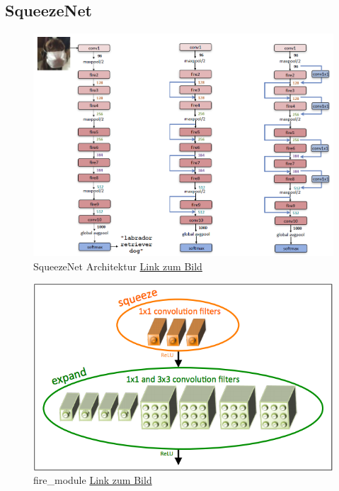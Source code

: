 \documentclass[12pt,a4paper]{scrartcl}
\numberwithin{equation}{section}
\begin{document}
 \subsection{SqueezeNet}
 \begin{figure}[h]
 	\centering
 	\includegraphics[width=\textwidth ]{squeezenet}
 	\caption{ SqueezeNet Architektur \href{https://www.kdnuggets.com/2016/09/deep-learning-reading-group-squeezenet.html}{Link zum Bild} }
 	\label{fig:SqueezeNet}
 \end{figure}
 \begin{figure}[h]
	\centering
	\includegraphics[width=\textwidth ]{fire_module}
	\caption{ fire\_module \href{https://www.kdnuggets.com/2016/09/deep-learning-reading-group-squeezenet.html}{Link zum Bild} }
	\label{fig:fire_module}
\end{figure}
\end{document}
